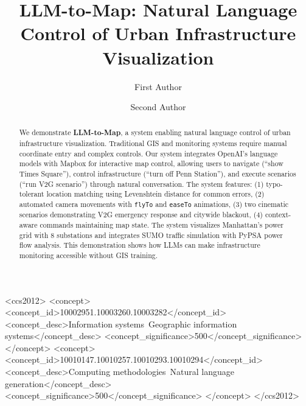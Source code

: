\documentclass[sigconf]{acmart}
\begin{document}
\title{LLM-to-Map: Natural Language Control of Urban Infrastructure Visualization}

\author{First Author}

\author{Second Author}

\renewcommand{\shortauthors}{Author et al.}


\begin{abstract}
We demonstrate \textbf{LLM-to-Map}, a system enabling natural language control of urban infrastructure visualization. Traditional GIS and monitoring systems require manual coordinate entry and complex controls. Our system integrates OpenAI's language models with Mapbox for interactive map control, allowing users to navigate (``show Times Square''), control infrastructure (``turn off Penn Station''), and execute scenarios (``run V2G scenario'') through natural conversation. The system features: (1) typo-tolerant location matching using Levenshtein distance for common errors, (2) automated camera movements with \texttt{flyTo} and \texttt{easeTo} animations, (3) two cinematic scenarios demonstrating V2G emergency response and citywide blackout, (4) context-aware commands maintaining map state. The system visualizes Manhattan's power grid with 8 substations and integrates SUMO traffic simulation with PyPSA power flow analysis. This demonstration shows how LLMs can make infrastructure monitoring accessible without GIS training.
\end{abstract}

\begin{CCSXML}
<ccs2012>
<concept>
<concept_id>10002951.10003260.10003282</concept_id>
<concept_desc>Information systems~Geographic information systems</concept_desc>
<concept_significance>500</concept_significance>
</concept>
<concept>
<concept_id>10010147.10010257.10010293.10010294</concept_id>
<concept_desc>Computing methodologies~Natural language generation</concept_desc>
<concept_significance>500</concept_significance>
</concept>
</ccs2012>
\end{CCSXML}

\end{document}
